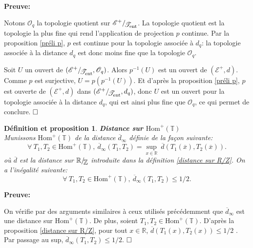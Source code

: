 \documentclass[11pt,a4 paper]{article}
\newtheorem{definitionproposition}[theoreme]{Définition et proposition}
\newcommand{\Tbb}{\mathbb{T}}
\newcommand{\Rbb}{\mathbb{R}}
\newcommand{\Zbb}{\mathbb{Z}}
\newcommand{\Ec}{\mathcal{E}}
\newcommand{\HomT}{\mathrm{Hom}^+(\Tbb)}
\newcommand{\Tent}{\mathcal{T}_{\mathrm{ent}}}
\newcommand*{\EnsembleQuotient}[2]%
{\ensuremath{%
		#1/\!\raisebox{-.65ex}{\ensuremath{\mathcal{#2}}}}}
\newenvironment{defippt}{\begin{box_defippt}\begin{definitionproposition}}{\end{definitionproposition}\end{box_defippt}}
\begin{document}
	\textbf{Preuve:}
	\par Notons $\mathcal{O}_q$ la topologie quotient sur $\EnsembleQuotient{\Ec^+}{\Tent}$. La topologie quotient est la topologie la plus fine qui rend l'application de projection $p$ continue. Par la proposition \ref{préli p}, $p$ est continue pour la topologie associée à $d_q$: la topologie associée à la distance $d_q$ est donc moins fine que la topologie $\mathcal{O}_q$.\\
	
	\par Soit $U$ un ouvert de $(\EnsembleQuotient{\Ec^+}{\Tent},\mathcal{O}_q)$. Alors $p^{-1}(U)$ est un ouvert de $(\Ec^+,d)$. Comme $p$ est surjective, $U=p(p^{-1}(U))$. Et d'après la proposition \ref{préli p}, $p$ est ouverte de $(\Ec^+,d)$ dans $(\EnsembleQuotient{\mathcal{E}^+}{\Tent},d_q)$, donc $U$ est un ouvert pour la topologie associée à la distance $d_q$, qui est ainsi plus fine que $\mathcal{O}_q$, ce qui permet de conclure. $\hfill \square$\\








\begin{defippt}\label{distance sur HomT}\textbf{Distance sur $\HomT$}\\
	Munissons $\HomT$ de la distance $\overline{d}_\infty$ définie de la façon suivante:
	$$\forall\ T_1, T_2 \in \HomT,\ \overline{d}_\infty(T_1,T_2)= \underset{x\in \Rbb}{\sup}\ \overline{d}(T_1(\overline{x}),T_2(\overline{x})).$$
	où $\overline{d}$ est la distance sur $\EnsembleQuotient{\Rbb}{\Zbb}$ introduite dans la définition \ref{distance sur R/Z}. On a l'inégalité suivante:
	$$\forall\ T_1, T_2 \in \HomT,\ \overline{d}_\infty(T_1,T_2)\leq 1/2.$$
\end{defippt}

	\textbf{Preuve:}
	\par On vérifie par des arguments similaires à ceux utilisés précédemment que $\overline{d}_\infty$ est une distance sur $\HomT$. De plus, soient $T_1, T_2 \in \HomT$. D'après la proposition \ref{distance sur R/Z}, pour tout $x \in \Rbb$, $\overline{d}(T_1(x),T_2(x)) \leq1/2$ . Par passage au sup, $\overline{d}_\infty(T_1,T_2)\leq 1/2$. $\hfill \square$\\
\end{document}
